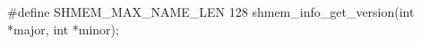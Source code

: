 \synC
#define SHMEM_MAX_NAME_LEN 128
shmem_info_get_version(int *major, int *minor);


\synF



{
	
}
{
		\desR{}
	\notesB{}
}
		
\exampleB{
}
\eAPI

